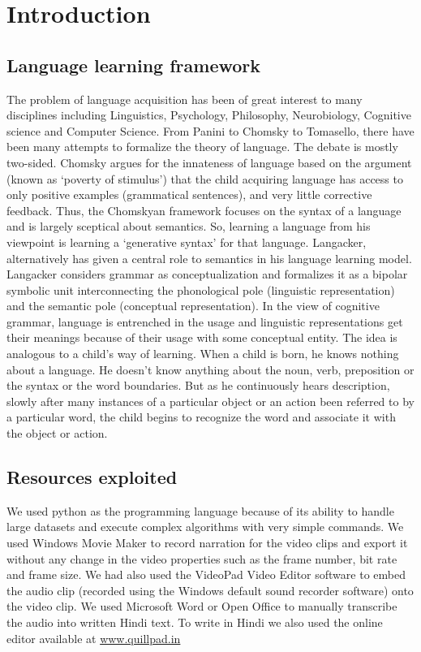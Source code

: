 \documentclass[12pt, a4paper]{report}
\begin{document}
\chapter{Introduction}
\section{Language learning framework}
The problem of language acquisition has been of great interest to many disciplines including Linguistics, Psychology, Philosophy, Neurobiology, Cognitive science and Computer Science. From Panini\cite{} to Chomsky\cite{} to Tomasello, there have been many attempts to formalize the theory of language. The debate is mostly two-sided. Chomsky\cite{} argues for the innateness of language based on the argument (known as `poverty of stimulus') that the child acquiring language has access to only positive examples (grammatical sentences), and very little corrective feedback. Thus, the Chomskyan framework focuses on the syntax of a language and is largely sceptical about semantics. So, learning a language from his viewpoint is learning a `generative syntax' for that language. Langacker\cite{}, alternatively has given a central role to semantics in his language learning model. Langacker\cite{} considers grammar as conceptualization and formalizes it as a bipolar symbolic unit interconnecting the phonological pole (linguistic representation) and the semantic pole (conceptual representation). In the view of cognitive grammar, language is entrenched in the usage and linguistic representations get their meanings because of their usage with some conceptual entity.
The idea is analogous to a child’s way of learning. When a child is born, he knows nothing about a language. He doesn’t know anything about the noun, verb, preposition or the syntax or the word boundaries. But as he continuously hears description, slowly after many instances of a particular object or an action been referred to by a particular word, the child begins to recognize the word and associate it with the object or action. 

\section{Resources exploited}
We used python as the programming language because of its ability to handle large datasets and execute complex algorithms with very simple commands. We used Windows Movie Maker to record narration for the video clips and export it without any change in the video properties such as the frame number, bit rate and frame size. We had also used the VideoPad Video Editor software to embed the audio clip (recorded using the Windows default sound recorder software) onto the video clip. We used Microsoft Word or Open Office to manually transcribe the audio into written Hindi text. To write in Hindi we also used the online editor available at \url{www.quillpad.in} 
\end{document}
